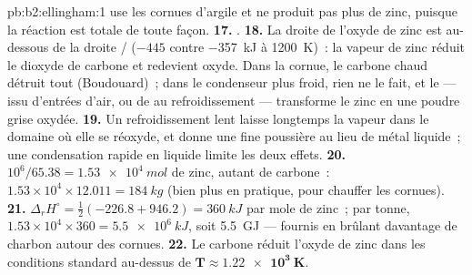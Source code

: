 \begin{solution}{pb:b2:ellingham:1}
use les cornues d'argile et ne produit pas plus de zinc, puisque la réaction est
totale de toute façon.
\textbf{17.} .
\textbf{18.} La droite de l'oxyde de zinc est au-dessous de la droite /
($-445$ contre \qty{-357}{kJ} à \qty{1200}{K})~: la vapeur de zinc réduit le dioxyde
de carbone et redevient oxyde. Dans la cornue, le carbone chaud détruit tout
 (Boudouard)~; dans le condenseur plus froid, rien ne le fait, et le  --- issu
d'entrées d'air, ou de  au refroidissement --- transforme le zinc en
une poudre grise oxydée.
\textbf{19.} Un refroidissement lent laisse longtemps la vapeur dans le domaine où
elle se réoxyde, et donne une fine poussière au lieu de métal liquide~; une condensation
rapide en liquide limite les deux effets.
\textbf{20.} $10^6/65.38 = \qty{1.53e4}{mol}$ de zinc, autant de carbone~:
$1.53 \times 10^4 \times 12.011 = \qty{184}{kg}$ (bien plus en pratique, pour chauffer les
cornues).
\textbf{21.} $\Delta_r H^\circ = \frac12(-226.8 + 946.2) = \qty{+360}{kJ}$ par
mole de zinc~; par tonne, $1.53 \times 10^4 \times 360 = \qty{5.5e6}{kJ}$, soit
\qty{5.5}{GJ} --- fournis en brûlant davantage de charbon autour des cornues.
\textbf{22.} Le carbone réduit l'oxyde de zinc dans les conditions standard au-dessus de
$\boldsymbol{T \approx \qty{1.22e3}{K}}$.
\end{solution}
